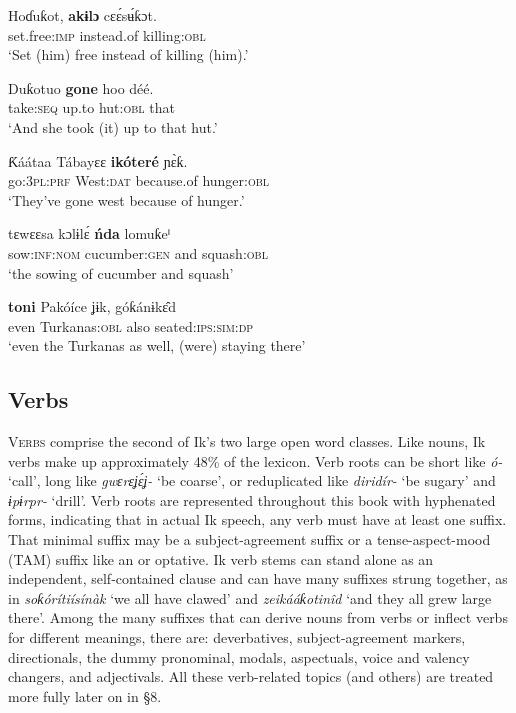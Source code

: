 \ea\label{ex:morph:4}
\gll Hoɗuƙot{\ᵉ},   \textbf{akɨlɔ}     cɛ\'{ɛ}s\'{ʉ}ƙɔt\ᶤ. \\
set.free:\textsc{imp}   instead.of   killing:\textsc{obl}    \\
\glt ‘Set (him) free instead of killing (him).’ 
\z




\ea\label{ex:morph:5}
\gll Duƙotuo   \textbf{gone}   hoo     déé. \\
take:\textsc{seq}   up.to   hut:\textsc{obl}   that    \\
\glt ‘And she took (it) up to that hut.’ 
\z




\ea\label{ex:morph:6}
\gll Ƙáátaa   Tábayɛɛ   \textbf{ikóteré}   ɲ\`{ɛ}ƙ{\ᵋ}. \\
go:\textsc{3pl:prf}   West:\textsc{dat}   because.of   hunger:\textsc{obl}    \\
\glt ‘They’ve gone west because of hunger.’ 
\z




\ea\label{ex:morph:7}
\gll tɛwɛɛsa     kɔlɨl{\Í}\'{ɛ}       \textbf{ńda}   lomuƙeⁱ \\
sow:\textsc{inf:nom}   cucumber:\textsc{gen}   and   squash:\textsc{obl}   \\
\glt ‘the sowing of cucumber and squash’ 
\z




\ea\label{ex:morph:8}
\gll \textbf{toni}   Pakóíce     ʝɨk,   góƙánɨk\^{ɛ}d{\ᵋ} \\
even  Turkanas:\textsc{obl}   also   seated:\textsc{ips:sim:dp}    \\
\glt ‘even the Turkanas as well, (were) staying there’ 
\z






\subsection{Verbs}\label{sec:3.8}


\textsc{Verbs} comprise the second of Ik’s two large open word classes. Like nouns, Ik verbs make up approximately 48\% of the lexicon. Verb roots can be short like \textit{ó-} ‘call’, long like \textit{gwɛrɛʝ\'{ɛ}ʝ-} ‘be coarse’, or reduplicated like \textit{diridír-} ‘be sugary’ and \textit{ɨpɨr{\Í}p{\Í}r-} ‘drill’. Verb roots are represented throughout this book with hyphenated forms, indicating that in actual Ik speech, any verb must have at least one suffix. That minimal suffix may be a subject-agreement suffix or a tense-aspect-mood (TAM) suffix like an  or optative. Ik verb stems can stand alone as an independent, self-contained clause and can have many suffixes strung together, as in \textit{soƙórítiísínàk\ᵃ} ‘we all have clawed’ and \textit{zeikááƙotinîd{\ᵉ}} ‘and they all grew large there’. Among the many suffixes that can derive nouns from verbs or inflect verbs for different meanings, there are: deverbatives, subject-agreement markers, directionals, the dummy pronominal, modals, aspectuals, voice and valency changers, and adjectivals. All these verb-related topics (and others) are treated more fully later on in §8.




